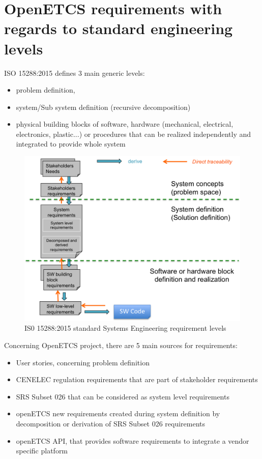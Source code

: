\documentclass[11pt]{template/openetcs_report}
\begin{document}
\section{OpenETCS requirements with regards to standard engineering levels}
\label{sec-1}
ISO 15288:2015 defines 3 main generic levels: 
\begin{itemize}
\item problem definition,
\item system/Sub system definition (recursive decomposition) 
\item physical building blocks of software, hardware (mechanical, electrical, electronics, plastic...) or procedures that can be realized independently and integrated to provide whole system
\end{itemize}

\begin{figure}[htb]
\centering
\includegraphics[width=.9\linewidth]{./images/standardRequirementEngineering.png}
\caption{\label{fig:standardReqEngineering}IS0 15288:2015 standard Systems Engineering requirement levels}
\end{figure}

Concerning OpenETCS project, there are 5 main sources for requirements:
\begin{itemize}
\item User stories, concerning problem definition
\item CENELEC regulation requirements that are part of stakeholder requirements
\item SRS Subset 026 that can be considered as system level requirements
\item openETCS new requirements created during system definition by decomposition or derivation of SRS Subset 026 requirements
\item openETCS API, that provides software requirements to integrate a vendor specific platform
\end{itemize}
\end{document}
